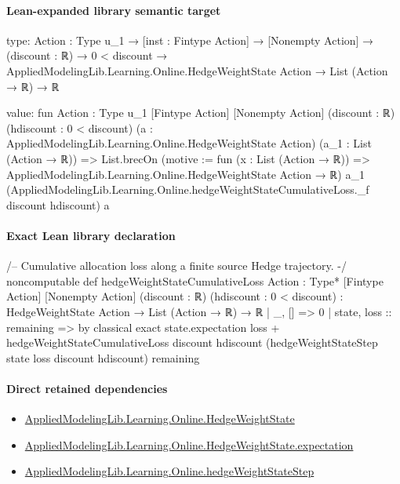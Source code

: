 \documentclass[10pt]{article}
\begin{document}
\paragraph{Lean-expanded library semantic target}
\begin{ReviewVerbatim}
type:
{Action : Type u_1} →
  [inst : Fintype Action] →
    [Nonempty Action] →
      (discount : ℝ) → 0 < discount → AppliedModelingLib.Learning.Online.HedgeWeightState Action → List (Action → ℝ) → ℝ

value:
fun {Action : Type u_1} [Fintype Action] [Nonempty Action] (discount : ℝ) (hdiscount : 0 < discount)
    (a : AppliedModelingLib.Learning.Online.HedgeWeightState Action) (a_1 : List (Action → ℝ)) =>
  List.brecOn (motive := fun (x : List (Action → ℝ)) => AppliedModelingLib.Learning.Online.HedgeWeightState Action → ℝ)
    a_1 (AppliedModelingLib.Learning.Online.hedgeWeightStateCumulativeLoss._f discount hdiscount) a
\end{ReviewVerbatim}

\paragraph{Exact Lean library declaration}
\begin{ReviewVerbatim}
/-- Cumulative allocation loss along a finite source Hedge trajectory. -/
noncomputable def hedgeWeightStateCumulativeLoss
    {Action : Type*} [Fintype Action] [Nonempty Action]
    (discount : ℝ) (hdiscount : 0 < discount) :
    HedgeWeightState Action → List (Action → ℝ) → ℝ
  | _, [] => 0
  | state, loss :: remaining =>
      by
        classical
        exact state.expectation loss +
          hedgeWeightStateCumulativeLoss discount hdiscount
            (hedgeWeightStateStep state loss discount hdiscount) remaining
\end{ReviewVerbatim}

\paragraph{Direct retained dependencies}
\begin{itemize}\raggedright
\item \hyperlink{library-prerequisite-8196082d02788389}{Applied\allowbreak{}Modeling\allowbreak{}Lib.\allowbreak{}Learning.\allowbreak{}Online.\allowbreak{}Hedge\allowbreak{}Weight\allowbreak{}State}
\item \hyperlink{governing-declaration-fa118dc278ea8ed2}{Applied\allowbreak{}Modeling\allowbreak{}Lib.\allowbreak{}Learning.\allowbreak{}Online.\allowbreak{}Hedge\allowbreak{}Weight\allowbreak{}State.\allowbreak{}expectation}
\item \hyperlink{governing-declaration-f4d506edff5447e0}{Applied\allowbreak{}Modeling\allowbreak{}Lib.\allowbreak{}Learning.\allowbreak{}Online.\allowbreak{}hedge\allowbreak{}Weight\allowbreak{}State\allowbreak{}Step}
\end{itemize}
\end{document}
